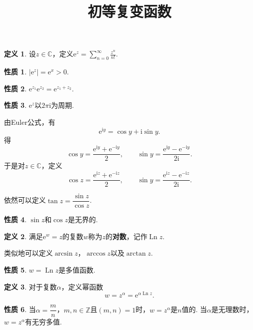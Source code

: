\documentclass[12pt]{ctexart}
\title{\vspace{-2em}\textbf{初等复变函数}\vspace{-2em}}
\date{ }
\theoremstyle{definition}
\newtheorem{definition}{定义}
\newtheorem{property}{性质}
\theoremstyle{plain}
\newcommand{\iu}{\mathrm{i}}
\newcommand{\eu}{\mathrm{e}}
\newcommand{\Ln}{\operatorname{Ln}}
\begin{document}
	\maketitle
	\begin{definition}
		设$z\in\mathbb{C}$，定义$\eu^{z}=\displaystyle\sum_{n=0}^{\infty}\frac{z^n}{n!}$.
	\end{definition}
	\begin{property}
		$|\eu^z|=\eu^x>0$.
	\end{property}
	\begin{property}
	$\eu^{z_1}\eu^{z_2}=\eu^{z_1+z_2}$.
	\end{property}
	\begin{property}
		$\eu^z$以$2\pi\iu$为周期.
	\end{property}
	
	由Euler公式，有
	$$\eu^{\iu y}=\cos y+\iu\sin y.$$
	得
	$$\cos y=\frac{\eu^{\iu y}+\eu^{-\iu y}}{2},\qquad\sin y=\frac{\eu^{\iu y}-\eu^{-\iu y}}{2\iu}.$$
	于是对$z\in\mathbb{C}$，定义
	$$\cos z=\frac{\eu^{\iu z}+\eu^{-\iu z}}{2},\qquad\sin y=\frac{\eu^{\iu z}-\eu^{-\iu z}}{2\iu}.$$
	
	依然可以定义$\tan z=\dfrac{\sin z}{\cos z}$.
	\begin{property}
		$\sin z$和$\cos z$是无界的.
	\end{property}
	\begin{definition}
		满足$\eu^w=z$的复数$w$称为$z$的\textbf{对数}，记作$\Ln z$.
	\end{definition}
	类似地可以定义$\arcsin z$，$\arccos z$以及$\arctan z$.
	\begin{property}
		$w=\Ln z$是多值函数.
	\end{property}
	\begin{definition}
		对于复数$\alpha$，定义幂函数
		$$w=z^{\alpha}=\eu^{\alpha\Ln z}.$$
	\end{definition}
	\begin{property}
		当$\alpha=\dfrac{m}{n}$，$m,n\in\mathbb{Z}$且$(m,n)=1$时，$w=z^{\alpha}$是$n$值的. 当$\alpha$是无理数时，$w=z^{\alpha}$有无穷多值.
	\end{property}
\end{document}
